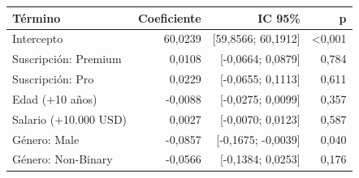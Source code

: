 \begin{tabular}{lrrr}
\toprule
Término & Coeficiente & IC 95\% & p \\
\midrule
Intercepto & 60,0239 & [59,8566; 60,1912] & <0,001 \\
Suscripción: Premium & 0,0108 & [-0,0664; 0,0879] & 0,784 \\
Suscripción: Pro & 0,0229 & [-0,0655; 0,1113] & 0,611 \\
Edad (+10 años) & -0,0088 & [-0,0275; 0,0099] & 0,357 \\
Salario (+10.000 USD) & 0,0027 & [-0,0070; 0,0123] & 0,587 \\
Género: Male & -0,0857 & [-0,1675; -0,0039] & 0,040 \\
Género: Non-Binary & -0,0566 & [-0,1384; 0,0253] & 0,176 \\
\bottomrule
\end{tabular}
